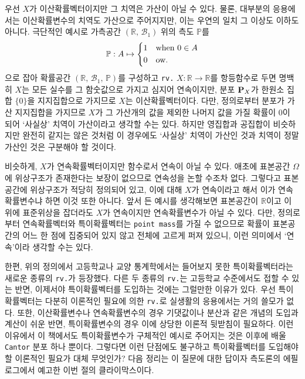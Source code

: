 우선 $X$가 이산확률벡터이지만 그 치역은 가산이 아닐 수 있다. 물론, 대부분의 응용에서는 이산확률변수의 치역도 가산으로 주어지지만, 이는 우연의 일치 그 이상도 이하도 아니다. 극단적인 예시로 가측공간 $(\mathbb{R},\,\mathcal{B}_1)$ 위의 측도 $\mathbb{P}$를
\begin{equation*}
    \mathbb{P}:A\mapsto
    \begin{dcases*}
        1&when $0\in A$\\
        0&ow.
    \end{dcases*}
\end{equation*}
으로 잡아 확률공간 $(\mathbb{R},\,\mathcal{B}_1,\,\mathbb{P})$를 구성하고 \texttt{rv.} $X:\mathbb{R}\to\mathbb{R}$를 항등함수로 두면 명백히 $X$는 모든 실수를 그 함숫값으로 가지고 심지어 연속이지만, 분포 $\mathbf{P}_X$가 한원소 집합 $\{0\}$을 지지집합으로 가지므로 $X$는 이산확률벡터이다. 다만, 정의로부터 분포가 가산 지지집합을 가지므로 $X$가 그 가산개의 값을 제외한 나머지 값을 가질 확률이 $0$이 되어 `사실상' 치역이 가산이라고 생각할 수는 있다. 하지만 영집합과 공집합이 비슷하지만 완전히 같지는 않은 것처럼 이 경우에도 `사실상' 치역이 가산인 것과 치역이 정말 가산인 것은 구분해야 할 것이다.

비슷하게, $X$가 연속확률벡터이지만 함수로서 연속이 아닐 수 있다. 애초에 표본공간 $\Omega$에 위상구조가 존재한다는 보장이 없으므로 연속성을 논할 수조차 없다. 그렇다고 표본공간에 위상구조가 적당히 정의되어 있고, 이에 대해 $X$가 연속이라고 해서 이가 연속확률변수냐 하면 이것 또한 아니다. 앞서 든 예시를 생각해보면 표본공간이 $\mathbb{R}$이고 이 위에 표준위상을 잡더라도 $X$가 연속이지만 연속확률변수가 아닐 수 있다. 다만, 정의로부터 연속확률벡터와 특이확률벡터는 \texttt{point mass}를 가질 수 없으므로 확률이 표본공간의 어느 한 점에 집중되어 있지 않고 전체에 고르게 퍼져 있으니, 이런 의미에서 `연속'이라 생각할 수는 있다.

한편, 위의 정의에서 고등학교나 교양 통계학에서는 들어보지 못한 특이확률벡터라는 새로운 종류의 \texttt{rv.}가 등장했다. 다른 두 종류의 \texttt{rv.}는 고등학교 수준에서도 접할 수 있는 반면, 이제서야 특이확률벡터를 도입하는 것에는 그럴만한 이유가 있다. 우선 특이확률벡터는 다분히 이론적인 필요에 의한 \texttt{rv.}로 실생활의 응용에서는 거의 쓸모가 없다. 또한, 이산확률변수나 연속확률변수의 경우 기댓값이나 분산과 같은 개념의 도입과 계산이 쉬운 반면, 특이확률변수의 경우 이에 상당한 이론적 뒷받침이 필요하다. 이런 이유에서 이 책에서도 특이확률변수가 구체적인 예시로 주어지는 것은 이후에 배울 \texttt{Cantor} 분포 하나 뿐이다. 그렇다면 이런 단점에도 불구하고 특이확률벡터를 도입해야 할 이론적인 필요가 대체 무엇인가? 다음 정리는 이 질문에 대한 답이자 측도론의 에필로그에서 예고한 이번 절의 클라이막스이다.


